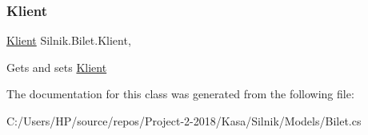 \subsubsection{\texorpdfstring{Klient}{Klient}}
{\footnotesize\ttfamily \mbox{\hyperlink{class_silnik_1_1_klient}{Klient}} Silnik.\+Bilet.\+Klient\hspace{0.3cm}{\ttfamily [get]}, {\ttfamily [set]}}



Gets and sets \mbox{\hyperlink{class_silnik_1_1_klient}{Klient}} 



The documentation for this class was generated from the following file\+:\begin{DoxyCompactItemize}
\item 
C\+:/\+Users/\+H\+P/source/repos/\+Project-\/2-\/2018/\+Kasa/\+Silnik/\+Models/Bilet.\+cs\end{DoxyCompactItemize}
